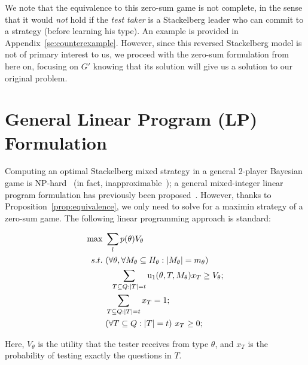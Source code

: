\documentclass{article}
\begin{document}
We note that the equivalence to this zero-sum game is not complete, in the
sense that it would {\em not} hold if the {\em test taker} is a Stackelberg
leader who can commit to a strategy (before learning his type).  An example
is provided in Appendix~\ref{se:counterexample}.  However, since this
reversed Stackelberg model is not of primary interest to
us, we proceed with the zero-sum formulation from here on, focusing on $G'$
knowing that its solution will give us a solution to our original problem.


\section{General Linear Program (LP) Formulation}

Computing an optimal Stackelberg mixed strategy in a general 2-player
Bayesian game is NP-hard~\cite{Conitzer06:Computing} (in fact,
inapproximable~\cite{Letchford09:Learning}); a general mixed-integer linear
program formulation has previously been
proposed~\cite{Paruchuri08:Playing}.
However, thanks to Proposition~\ref{prop:equivalence}, we only need to
solve for a maximin strategy of a zero-sum game.  The following linear
programming approach is standard:

\begin{align}\label{eqn:maximin}
	\max~ &\sum_l p(\theta) V_\theta \\
	s.t. \ &(\forall \theta, \forall M_\theta \subseteq H_\theta
        : |M_\theta| = m_\theta)\nonumber\\
	&~~ \sum_{T \subseteq Q: |T| = t} \text  u_1(\theta, T, M_\theta) x_T \geq V_\theta;\nonumber\\
	&\sum_{T \subseteq Q: |T| = t} x_T = 1;\nonumber\\
	&(\forall T \subseteq Q: |T| = t) \  x_T \geq 0;\nonumber
\end{align}

Here, $V_\theta$ is the utility that the tester receives from type
$\theta$, and $x_T$ is the probability of testing exactly the questions in
$T$.
%
%
%
% 
\end{document}
